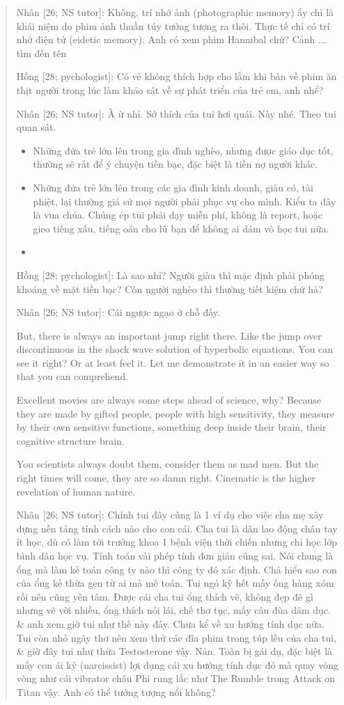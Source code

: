 \documentclass[12pt]{article}
\begin{document}
\begin{quote}
	{\sf Nhân [26; NS tutor]}: Không, trí nhớ ảnh (photographic memory) ấy chỉ là khái niệm do phim ảnh thuần túy tưởng tượng ra thôi. Thực tế chỉ có trí nhớ điện tử (eidetic memory). Anh có xem phim Hannibal chứ? Cảnh ... tìm đến tên
	
	{\sf Hồng [28; pychologist]}: Có vẻ không thích hợp cho lắm khi bàn về phim ăn thịt người trong lúc làm khảo sát về sự phát triển của trẻ em, anh nhể?
	
	{\sf Nhân [26; NS tutor]}: À ừ nhỉ. Sở thích của tui hơi quái. Này nhé. Theo tui quan sát.
	\begin{itemize}
		\item Những đứa trẻ lớn lên trong gia đình nghèo, nhưng được giáo dục tốt, thường sẽ rất để ý chuyện tiền bạc, đặc biệt là tiền nợ người khác.
		\item Những đứa trẻ lớn lên trong các gia đình kinh doanh, giàu có, tài phiệt, lại thường giả sử mọi người phải phục vụ cho mình. Kiểu ta đây là vua chúa. Chúng ép tui phải dạy miễn phí, không là report, hoặc gieo tiếng xấu, tiếng oán cho lũ bạn để không ai dám vô học tui nữa.
		\item 
	\end{itemize}
	{\sf Hồng [28; pychologist]}: Là sao nhỉ? Người giàu thì mặc định phải phóng khoáng về mặt tiền bạc? Còn người nghèo thì thường tiết kiệm chứ hả?
	
	{\sf Nhân [26; NS tutor]}: Cái ngược ngạo ở chỗ đấy. 
	
	But, there is always an important jump right there. Like the jump over discontinuous in the shock wave solution of hyperbolic equations. You can see it right? Or at least feel it. Let me demonstrate it in an easier way so that you can comprehend.
	
	Excellent movies are always some steps ahead of science, why? Because they are made by gifted people, people with high sensitivity, they measure by their own sensitive functions, something deep inside their brain, their cognitive structure brain.
	
	You scientists always doubt them, consider them as mad men. But the right times will come, they are so damn right. Cinematic is the higher revelation of human nature.
	
	{\sf Nhân [26; NS tutor]}: Chính tui đây cũng là 1 ví dụ cho việc cha mẹ xây dựng nền tảng tính cách nào cho con cái. Cha tui là dân lao động chân tay ít học, dù có làm tới trưởng khoa 1 bệnh viện thời chiến nhưng chỉ học lớp bình dân học vụ. Tính toán vài phép tính đơn giản cũng sai. Nói chung là ổng mà làm kế toán công ty nào thì công ty đó xác định. Chả hiểu sao con của ổng kế thừa gen từ ai mà mê toán. Tui ngó kỹ hết mấy ông hàng xóm rồi nên cũng yên tâm. Được cái cha tui ổng thích vẽ, không đẹp đẽ gì nhưng vẽ vời nhiều, ổng thích nói lái, chế thơ tục, mấy câu đùa dâm dục. \& anh xem giờ tui như thế này đây. Chưa kể về xu hướng tính dục nữa. Tui còn nhỏ ngây thơ nên xem thử các đĩa phim trong túp lều của cha tui, \& giờ đây tui như thừa Testosterone vậy. Nản. Toàn bị gái dụ, đặc biệt là mấy con ái kỷ (narcissist) lợi dụng cái xu hướng tính dục đó mà quay vòng vòng như cái vibrator châu Phi rung lắc như The Rumble trong Attack on Titan vậy. Anh có thể tưởng tượng nổi không?
		

\end{quote}
\end{document}
